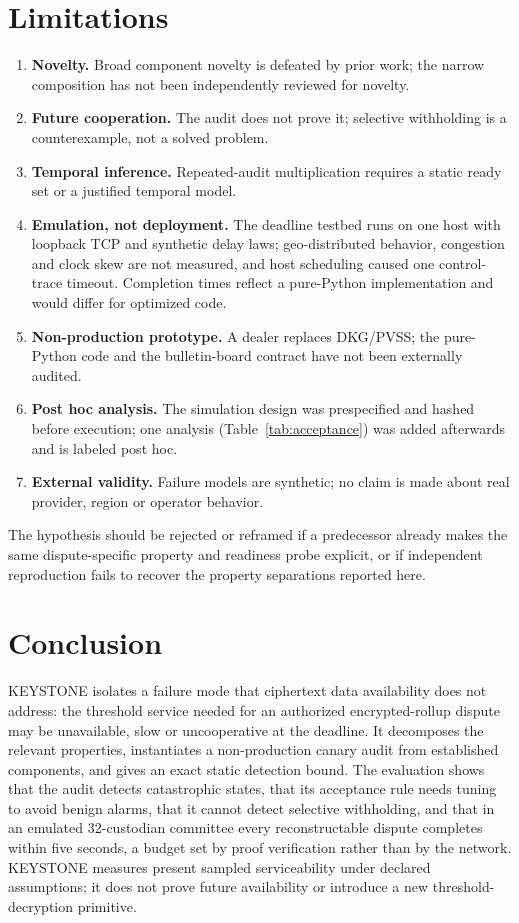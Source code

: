 \documentclass[10pt]{article}
\begin{document}
\section{Limitations}

\begin{enumerate}
  \item \textbf{Novelty.} Broad component novelty is defeated by prior work; the narrow composition has not been independently reviewed for novelty.
  \item \textbf{Future cooperation.} The audit does not prove it; selective withholding is a counterexample, not a solved problem.
  \item \textbf{Temporal inference.} Repeated-audit multiplication requires a static ready set or a justified temporal model.
  \item \textbf{Emulation, not deployment.} The deadline testbed runs on one host with loopback TCP and synthetic delay laws; geo-distributed behavior, congestion and clock skew are not measured, and host scheduling caused one control-trace timeout. Completion times reflect a pure-Python implementation and would differ for optimized code.
  \item \textbf{Non-production prototype.} A dealer replaces DKG/PVSS; the pure-Python code and the bulletin-board contract have not been externally audited.
  \item \textbf{Post hoc analysis.} The simulation design was prespecified and hashed before execution; one analysis (Table~\ref{tab:acceptance}) was added afterwards and is labeled post hoc.
  \item \textbf{External validity.} Failure models are synthetic; no claim is made about real provider, region or operator behavior.
\end{enumerate}
The hypothesis should be rejected or reframed if a predecessor already makes the same dispute-specific property and readiness probe explicit, or if independent reproduction fails to recover the property separations reported here.

\section{Conclusion}

KEYSTONE isolates a failure mode that ciphertext data availability does not address: the threshold service needed for an authorized encrypted-rollup dispute may be unavailable, slow or uncooperative at the deadline. It decomposes the relevant properties, instantiates a non-production canary audit from established components, and gives an exact static detection bound. The evaluation shows that the audit detects catastrophic states, that its acceptance rule needs tuning to avoid benign alarms, that it cannot detect selective withholding, and that in an emulated 32-custodian committee every reconstructable dispute completes within five seconds, a budget set by proof verification rather than by the network. KEYSTONE measures present sampled serviceability under declared assumptions; it does not prove future availability or introduce a new threshold-decryption primitive.
\end{document}
